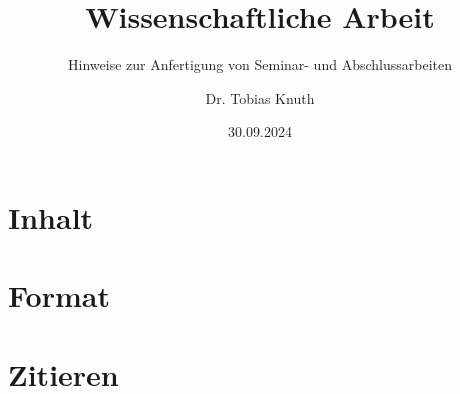 \documentclass[twoside=false]{scrbook}
\begin{document}
\titlehead{Name der Institution \hfill Sommersemester 2024}
\subject{Template}
\title{Wissenschaftliche Arbeit}
\subtitle{Hinweise zur Anfertigung von Seminar- und Abschlussarbeiten}
\publishers{Betreuung/Fachbereich}
\author{Dr. Tobias Knuth}
\date{30.09.2024}

\maketitle
\tableofcontents

\listoffigures
\listoftables

\chapter{Inhalt}

\chapter{Format}

\chapter{Zitieren}
\end{document}

